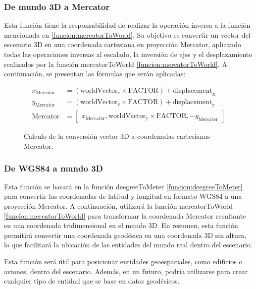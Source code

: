 \documentclass[a4paper, 11pt]{book}
\begin{document}
\subsubsection{De mundo 3D a Mercator}
\label{funcion:worldtoMercator}
Esta función tiene la responsabilidad de realizar la operación inversa a la función mencionada en \ref{funcion:mercatorToWorld}. Su objetivo es convertir un vector del escenario 3D en una coordenada cartesiana en proyección Mercator, aplicando todas las operaciones inversas al escalado, la inversión de ejes y el desplazamiento realizados por la función mercatorToWorld \ref{funcion:mercatorToWorld}. A continuación, se presentan las fórmulas que serán aplicadas:

\begin{figure}[h]
\begin{align*}
x_{\text{Mercator}} &= (\mathbf{\mathrm{worldVector}}_{\text{x}} \times \mathbf{\mathrm{FACTOR}}) + \mathbf{\mathrm{displacement}}_{\text{x}} \\
y_{\text{Mercator}} &= (\mathbf{\mathrm{worldVector}}_{\text{z}} \times \mathbf{\mathrm{FACTOR}}) + \mathbf{\mathrm{displacement}}_{\text{y}} \\
\mathbf{\mathrm{Mercator}} &= 
\begin{bmatrix}
x_{\text{Mercator}}, \mathbf{\mathrm{worldVector}}_{\text{y}} \times \mathbf{\mathrm{FACTOR}}, -y_{\text{Mercator}}
\end{bmatrix}
\end{align*}
\caption{Calculo de la conversión vector 3D a coordenadas cartesianas Mercator.}
  \label{formula:worldtoMercator}
\end{figure}

\subsubsection{De WGS84 a mundo 3D}
\label{funcion:degreeToWorld}
Esta función se basará en la función deegreeToMeter \ref{funcion:deegreeToMeter} para convertir las coordenadas de latitud y longitud en formato WGS84 a una proyección Mercator. A continuación, utilizará la función mercatorToWorld  \ref{funcion:mercatorToWorld} para transformar la coordenada Mercator resultante en una coordenada tridimensional en el mundo 3D. En resumen, esta función permitirá convertir una coordenada geodésica en una coordenada 3D sin altura, lo que facilitará la ubicación de las entidades del mundo real dentro del escenario.

Esta función será útil para posicionar entidades geoespaciales, como edificios o aviones, dentro del escenario. Además, en un futuro, podría utilizarse para crear cualquier tipo de entidad que se base en datos geodésicos.
\end{document}
